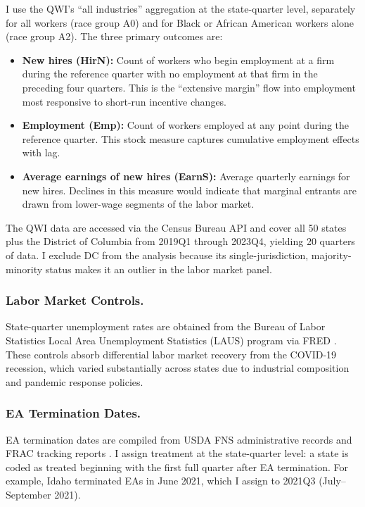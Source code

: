 \documentclass[12pt]{article}
\begin{document}
I use the QWI's ``all industries'' aggregation at the state-quarter level, separately for all workers (race group A0) and for Black or African American workers alone (race group A2). The three primary outcomes are:
\begin{itemize}
    \item \textbf{New hires (HirN):} Count of workers who begin employment at a firm during the reference quarter with no employment at that firm in the preceding four quarters. This is the ``extensive margin'' flow into employment most responsive to short-run incentive changes.
    \item \textbf{Employment (Emp):} Count of workers employed at any point during the reference quarter. This stock measure captures cumulative employment effects with lag.
    \item \textbf{Average earnings of new hires (EarnS):} Average quarterly earnings for new hires. Declines in this measure would indicate that marginal entrants are drawn from lower-wage segments of the labor market.
\end{itemize}

The QWI data are accessed via the Census Bureau API and cover all 50 states plus the District of Columbia from 2019Q1 through 2023Q4, yielding 20 quarters of data. I exclude DC from the analysis because its single-jurisdiction, majority-minority status makes it an outlier in the labor market panel.

\subsubsection*{Labor Market Controls.} State-quarter unemployment rates are obtained from the Bureau of Labor Statistics Local Area Unemployment Statistics (LAUS) program via FRED . These controls absorb differential labor market recovery from the COVID-19 recession, which varied substantially across states due to industrial composition and pandemic response policies.

\subsubsection*{EA Termination Dates.} EA termination dates are compiled from USDA FNS administrative records and FRAC tracking reports . I assign treatment at the state-quarter level: a state is coded as treated beginning with the first full quarter after EA termination. For example, Idaho terminated EAs in June 2021, which I assign to 2021Q3 (July--September 2021).
\end{document}
